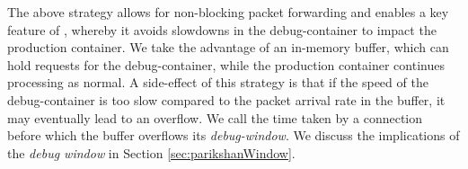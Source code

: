 The above strategy allows for non-blocking packet forwarding and enables a key feature of \parikshan, whereby it avoids slowdowns in the debug-container to impact the production container.
We take the advantage of an in-memory buffer, which can hold requests for the debug-container, while the production container continues processing as normal.
A side-effect of this strategy is that if the speed of the debug-container is too slow compared to the packet arrival rate in the buffer, it may eventually lead to an overflow. 
We call the time taken by a connection before which the buffer overflows its \emph{debug-window}.
We discuss the implications of the \emph{debug window} in Section \ref{sec:parikshanWindow}.  
